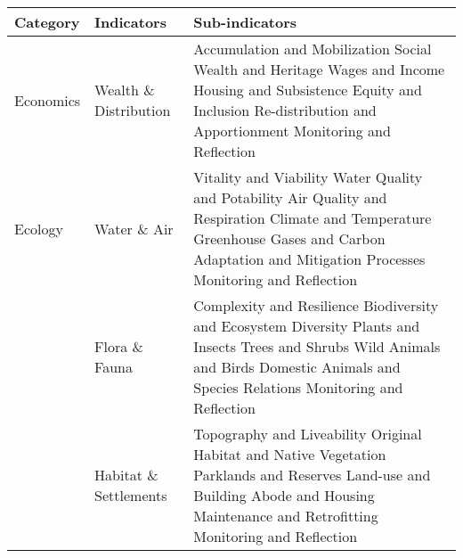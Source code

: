 \begin{table}[th]
\begin{center}
\begin{tabular}{ >{\raggedright\arraybackslash}p{} >{\raggedright\arraybackslash}p{} >{\raggedright\arraybackslash}p{} }
\hline
Category & Indicators & Sub-indicators \\
\hline
Economics & Wealth \& Distribution & Accumulation and Mobilization \linebreak Social Wealth and Heritage
Wages and Income \linebreak Housing and Subsistence \linebreak Equity and Inclusion \linebreak Re-distribution and Apportionment \linebreak Monitoring and Reflection \linebreak \\
\hline
Ecology & Water \& Air & Vitality and Viability \linebreak Water Quality and Potability \linebreak Air Quality and Respiration \linebreak Climate and Temperature \linebreak Greenhouse Gases and Carbon \linebreak Adaptation and Mitigation Processes \linebreak Monitoring and Reflection \linebreak \\
  & Flora \& Fauna & Complexity and Resilience \linebreak Biodiversity and Ecosystem Diversity
Plants and Insects \linebreak Trees and Shrubs \linebreak Wild Animals and Birds \linebreak Domestic Animals and Species Relations \linebreak Monitoring and Reflection \linebreak \\
  & Habitat \& Settlements & Topography and Liveability \linebreak Original Habitat and Native Vegetation \linebreak Parklands and Reserves \linebreak Land-use and Building \linebreak Abode and Housing \linebreak Maintenance and Retrofitting \linebreak Monitoring and Reflection \linebreak \\

\end{tabular}
\end{center}
\end{table}

